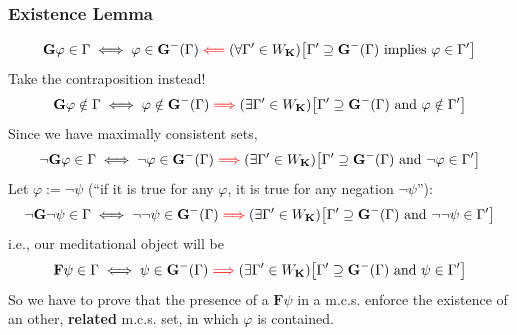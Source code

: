 \documentclass[xcolor=x11names]{beamer}
\newcommand{\cemph}[1]{\textcolor{red}{#1}}
\renewcommand{\emph}[1]{\textbf{#1}}
\newcommand{\FD}{\mathbf F}
\newcommand{\FB}{\mathbf G}
\newcommand{\forallin}[2]{(\forall #1 \in #2)}
\newcommand{\existsin}[2]{(\exists #1 \in #2)}
\begin{document}

\begin{frame}
\frametitle{Existence Lemma}

\[\FB \varphi \in \Gamma  \iff \varphi \in \FB^-(\Gamma) \mathrel{\cemph{\Longleftarrow}} \forallin {\Gamma'}{W_\mathbf K} \big[\Gamma' \supseteq \FB^-(\Gamma) \textup{ implies } \varphi \in \Gamma' \big]\]
Take the contraposition instead!
\[\FB \varphi \notin \Gamma  \iff \varphi \notin \FB^-(\Gamma) \mathrel{\cemph{\Longrightarrow}} \existsin {\Gamma'}{W_\mathbf K} \big[\Gamma' \supseteq \FB^-(\Gamma) \textup{ and } \varphi \notin \Gamma' \big]\]
Since we have maximally consistent sets,
\[\lnot \FB \varphi \in \Gamma  \iff  \lnot\varphi \in \FB^-(\Gamma) \mathrel{\cemph{\Longrightarrow}} \existsin {\Gamma'}{W_\mathbf K} \big[\Gamma' \supseteq \FB^-(\Gamma) \textup{ and } \lnot \varphi \in \Gamma' \big]\]
Let $\varphi :=\lnot \psi$ (``if it is true for any $\varphi$, it is true for any negation $\lnot \psi$''):
\[\lnot \FB \lnot \psi \in \Gamma  \iff  \lnot\lnot \psi \in \FB^-(\Gamma) \mathrel{\cemph{\Longrightarrow}} \existsin {\Gamma'}{W_\mathbf K} \big[\Gamma' \supseteq \FB^-(\Gamma) \textup{ and } \lnot \lnot \psi \in \Gamma' \big]\]
i.e., our meditational object will be
\[\FD \psi \in \Gamma  \iff  \psi \in \FB^-(\Gamma) \mathrel{\cemph{\Longrightarrow}} \existsin {\Gamma'}{W_\mathbf K} \big[\Gamma' \supseteq \FB^-(\Gamma) \textup{ and } \psi \in \Gamma' \big]\]
So we have to prove that the presence of a $\FD\psi$ in a m.c.s. enforce the existence of an other, \emph{related} m.c.s. set, in which $\varphi$ is contained.
\end{frame}

\end{document}
